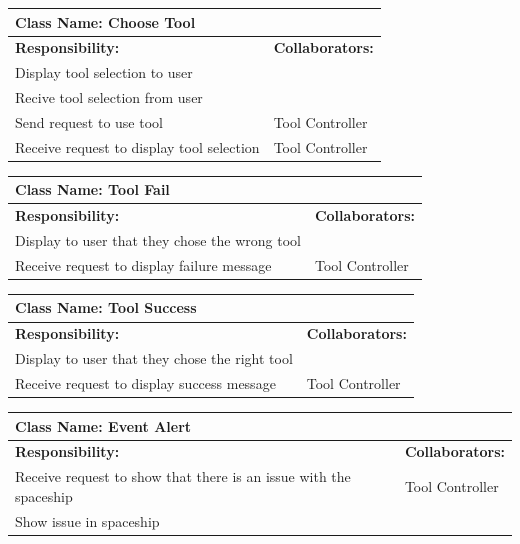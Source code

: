 \documentclass[12pt, titlepage]{article}
\begin{document}
	\begin{table}[H]
		\centering
		\begin{tabular}{|p{10cm}|p{5cm}|}
		\hline 
		 \multicolumn{2}{|l|}{\textbf{Class Name: Choose Tool}} \\
		\hline
		\textbf{Responsibility:} & \textbf{Collaborators:} \\
		\hline
		 Display tool selection to user& \\
		\hline
		 Recive tool selection from user& \\
		\hline
		 Send request to use tool & Tool Controller\\
		\hline
		 Receive request to display tool selection & Tool Controller \\
		\hline
		\end{tabular}
	\end{table}
	
	\begin{table}[H]
		\centering
		\begin{tabular}{|p{10cm}|p{5cm}|}
		\hline 
		 \multicolumn{2}{|l|}{\textbf{Class Name: Tool Fail}} \\
		\hline
		\textbf{Responsibility:} & \textbf{Collaborators:} \\
		\hline
		 Display to user that they chose the wrong tool & \\
		\hline
		Receive request to display failure message & Tool Controller \\
		\hline
		\end{tabular}
	\end{table}

	\begin{table}[H]
		\centering
		\begin{tabular}{|p{10cm}|p{5cm}|}
		\hline 
		 \multicolumn{2}{|l|}{\textbf{Class Name: Tool Success}} \\
		\hline
		\textbf{Responsibility:} & \textbf{Collaborators:} \\
		\hline
		 Display to user that they chose the right tool & \\
		\hline
		Receive request to display success message & Tool Controller \\
		\hline
		\end{tabular}
	\end{table}

	\begin{table}[H]
		\centering
		\begin{tabular}{|p{10cm}|p{5cm}|}
		\hline 
		 \multicolumn{2}{|l|}{\textbf{Class Name: Event Alert}} \\
		\hline
		\textbf{Responsibility:} & \textbf{Collaborators:} \\
		\hline
		 Receive request to show that there is an issue with the spaceship & Tool Controller\\
		\hline
		Show issue in spaceship & \\
		\hline
		\end{tabular}
	\end{table}
\end{document}
